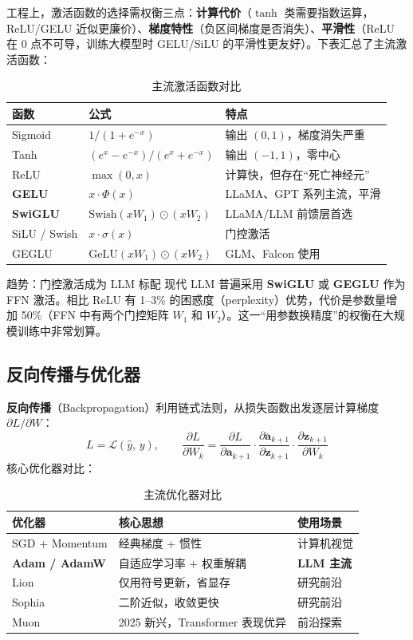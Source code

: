 \documentclass[12pt,a4paper]{article}
\begin{document}
工程上，激活函数的选择需权衡三点：\textbf{计算代价}（$\tanh$ 类需要指数运算，ReLU/GELU 近似更廉价）、\textbf{梯度特性}（负区间梯度是否消失）、\textbf{平滑性}（ReLU 在 0 点不可导，训练大模型时 GELU/SiLU 的平滑性更友好）。下表汇总了主流激活函数：

\begin{table}[htbp]
\centering
\small
\begin{tabular}{@{}llp{5.5cm}@{}}
\toprule
\textbf{函数} & \textbf{公式} & \textbf{特点}\\
\midrule
Sigmoid & $1/(1+e^{-x})$ & 输出 $(0,1)$，梯度消失严重\\
Tanh & $(e^x-e^{-x})/(e^x+e^{-x})$ & 输出 $(-1,1)$，零中心\\
ReLU & $\max(0,x)$ & 计算快，但存在“死亡神经元”\\
\textbf{GELU} & $x\cdot\Phi(x)$ & LLaMA、GPT 系列主流，平滑\\
\textbf{SwiGLU} & $\text{Swish}(xW_1)\odot(xW_2)$ & LLaMA/LLM 前馈层首选\\
SiLU / Swish & $x\cdot\sigma(x)$ & 门控激活\\
GEGLU & $\text{GeLU}(xW_1)\odot(xW_2)$ & GLM、Falcon 使用\\
\bottomrule
\end{tabular}
\caption{主流激活函数对比}
\end{table}

\begin{keybox}{趋势：门控激活成为 LLM 标配}
现代 LLM 普遍采用 \textbf{SwiGLU} 或 \textbf{GEGLU} 作为 FFN 激活。相比 ReLU 有 1--3\% 的困惑度（perplexity）优势，代价是参数量增加 50\%（FFN 中有两个门控矩阵 $W_1$ 和 $W_2$）。这一“用参数换精度”的权衡在大规模训练中非常划算。
\end{keybox}
\subsection{反向传播与优化器}
\textbf{反向传播}（Backpropagation）利用链式法则，从损失函数出发逐层计算梯度 $\partial L/\partial W$：
\[
L = \mathcal{L}(\hat{y},\, y), \qquad
\frac{\partial L}{\partial W_k} = \frac{\partial L}{\partial \mathbf{a}_{k+1}} \cdot \frac{\partial \mathbf{a}_{k+1}}{\partial \mathbf{z}_{k+1}} \cdot \frac{\partial \mathbf{z}_{k+1}}{\partial W_k}
\]
核心优化器对比：

\begin{table}[htbp]
\centering
\small
\begin{tabular}{@{}lll@{}}
\toprule
\textbf{优化器} & \textbf{核心思想} & \textbf{使用场景}\\
\midrule
SGD + Momentum & 经典梯度 + 惯性 & 计算机视觉\\
\textbf{Adam / AdamW} & 自适应学习率 + 权重解耦 & \textbf{LLM 主流}\\
Lion & 仅用符号更新，省显存 & 研究前沿\\
Sophia & 二阶近似，收敛更快 & 研究前沿\\
Muon & 2025 新兴，Transformer 表现优异 & 前沿探索\\
\bottomrule
\end{tabular}
\caption{主流优化器对比}
\end{table}
\end{document}
